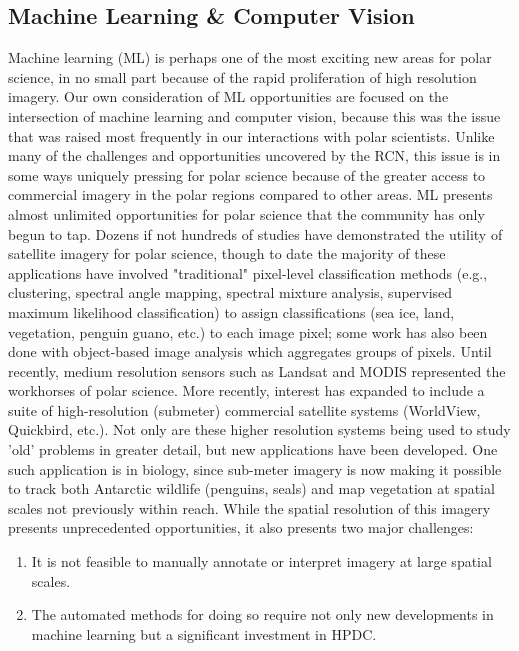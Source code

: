 \documentclass[10pt,letterpaper,draft]{article}
\begin{document}
\subsection*{Machine Learning \& Computer Vision}
Machine learning (ML) is perhaps one of the most exciting new areas for polar science, in no small part because of the rapid proliferation of high resolution imagery. Our own consideration of ML opportunities are focused on the intersection of machine learning and computer vision, because this was the issue that was raised most frequently in our interactions with polar scientists. Unlike many of the challenges and opportunities uncovered by the RCN, this issue is in some ways uniquely pressing for polar science because of the greater access to commercial imagery in the polar regions compared to other areas. ML presents almost unlimited opportunities for polar science that the community has only begun to tap. 
Dozens if not hundreds of studies have demonstrated the utility of satellite imagery for polar science, though to date the majority of these applications have involved "traditional" pixel-level classification methods (e.g., clustering, spectral angle mapping, spectral mixture analysis, supervised maximum likelihood classification) to assign classifications (sea ice, land, vegetation, penguin guano, etc.) to each image pixel; some work has also been done with object-based image analysis which aggregates groups of pixels. Until recently, medium resolution sensors such as Landsat and MODIS represented the workhorses of polar science.
More recently, interest has expanded to include a suite of high-resolution (submeter) commercial satellite systems (WorldView, Quickbird, etc.). Not only are these higher resolution systems being used to study 'old' problems in greater detail, but new applications have been developed. One such application is in biology, since sub-meter imagery is now making it possible to track both Antarctic wildlife (penguins, seals) and map vegetation at spatial scales not previously within reach. While the spatial resolution of this imagery presents unprecedented opportunities, it also presents two major challenges:
\begin{enumerate}
    \item It is not feasible to manually annotate or interpret imagery at large spatial scales.
    \item The automated methods for doing so require not only new developments in machine learning but a significant investment in HPDC.
\end{enumerate}
\end{document}
